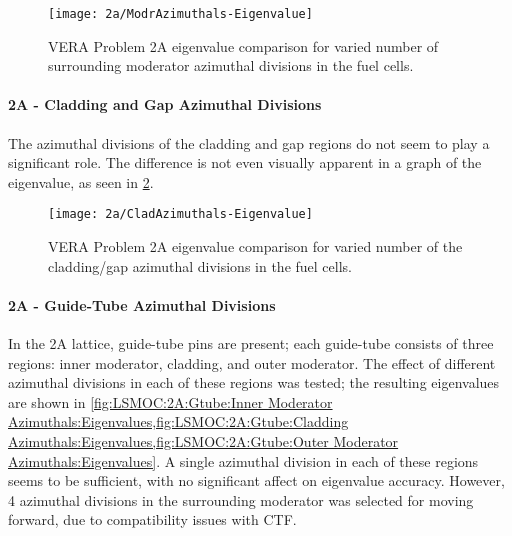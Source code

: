 {{{{{          \begin{figure}
            \centering
            \texttt{[image: 2a/ModrAzimuthals-Eigenvalue]}
            \caption{VERA Problem 2A eigenvalue comparison for varied number of surrounding moderator azimuthal divisions in the fuel cells. \label{fig:LSMOC:2A:Moderator Azimuthal:Eigenvalues}}
          \end{figure}
        }
        \paragraph{2A - Cladding and Gap Azimuthal Divisions}{
          The azimuthal divisions of the cladding and gap regions do not seem to play a significant role.
          The difference is not even visually apparent in a graph of the eigenvalue, as seen in \cref{fig:LSMOC:2A:Clad Azimuthal:Eigenvalues}.

          \begin{figure}
            \centering
            \texttt{[image: 2a/CladAzimuthals-Eigenvalue]}
            \caption{VERA Problem 2A eigenvalue comparison for varied number of the cladding/gap azimuthal divisions in the fuel cells. \label{fig:LSMOC:2A:Clad Azimuthal:Eigenvalues}}
          \end{figure}
        }
        \paragraph{2A - Guide-Tube Azimuthal Divisions}{
          In the 2A lattice, guide-tube pins are present; each guide-tube consists of three regions: inner moderator, cladding, and outer moderator.
          The effect of different azimuthal divisions in each of these regions was tested; the resulting eigenvalues are shown in \cref{fig:LSMOC:2A:Gtube:Inner Moderator Azimuthals:Eigenvalues,fig:LSMOC:2A:Gtube:Cladding Azimuthals:Eigenvalues,fig:LSMOC:2A:Gtube:Outer Moderator Azimuthals:Eigenvalues}.
          A single azimuthal division in each of these regions seems to be sufficient, with no significant affect on eigenvalue accuracy.
          However, 4 azimuthal divisions in the surrounding moderator was selected for moving forward, due to compatibility issues with \ac{CTF}.

}}}}}
